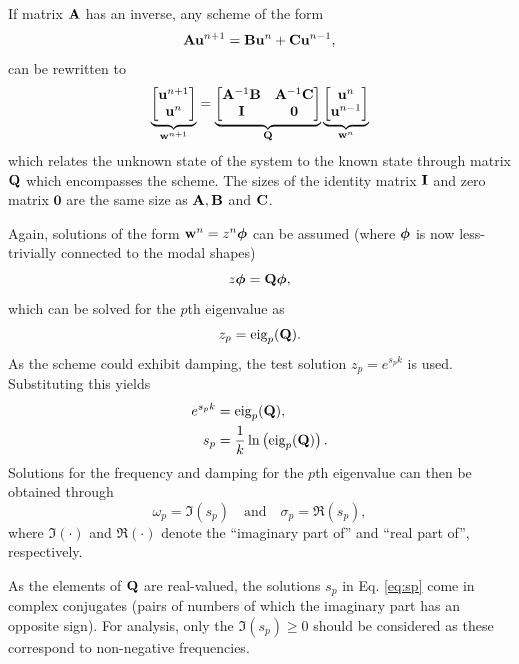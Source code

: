 {{{{If matrix $\mathbf{A}$ has an inverse, any scheme of the form
\begin{equation}\label{eq:modalForm}
    \mathbf{A}\mathbf{u}^{n+1}=\mathbf{B}\mathbf{u}^n + \mathbf{C}\mathbf{u}^{n-1},
\end{equation}
can be rewritten to
\begin{equation}\label{eq:oneStepForm}
    \underbrace{\begin{bmatrix}
        \mathbf{u}^{n+1}\\
        \mathbf{u}^n
    \end{bmatrix}}_{\mathbf{w}^{n+1}} = 
    \underbrace{\begin{bmatrix}
        \mathbf{A}^{-1}\mathbf{B} & \mathbf{A}^{-1}\mathbf{C}\\
        \mathbf{I} & \mathbf{0}
    \end{bmatrix}}_{\mathbf{Q}}
    \underbrace{\begin{bmatrix}
        \mathbf{u}^n\\
        \mathbf{u}^{n-1}
    \end{bmatrix}}_{\mathbf{w}^n}
\end{equation}
which relates the unknown state of the system to the known state through matrix $\mathbf{Q}$ which encompasses the scheme. The sizes of the identity matrix $\mathbf{I}$ and zero matrix $\mathbf{0}$ are the same size as $\mathbf{A}, \mathbf{B}$ and $\mathbf{C}$.

Again, solutions of the form $\mathbf{w}^n = z^n\boldsymbol{\phi}$ can be assumed (where $\boldsymbol{\phi}$ is now less-trivially connected to the modal shapes)
\begin{equation}
    z\boldsymbol{\phi} = \mathbf{Q}\boldsymbol{\phi} ,
\end{equation}
which can be solved for the $p$th eigenvalue as
\begin{equation}
    z_p = \text{eig}_p(\mathbf{Q}).
\end{equation}
As the scheme could exhibit damping, the test solution $z_p = e^{s_pk}$ is used. Substituting this yields
\begin{align}
    e^{s_pk} &= \text{eig}_p(\mathbf{Q}),\nonumber\\
    s_p &= \frac{1}{k}\ln \left(\text{eig}_p(\mathbf{Q})\right).\label{eq:sp}
\end{align}
Solutions for the frequency and damping for the $p$th eigenvalue can then be obtained through
\begin{equation}
    \omega_p = \mathfrak{I}(s_p) \quad \text{and} \quad \sigma_p = \mathfrak{R}(s_p),
\end{equation}
where $\mathfrak{I}(\cdot)$ and $\mathfrak{R}(\cdot)$ denote the ``imaginary part of'' and ``real part of'', respectively. 

As the elements of $\mathbf{Q}$ are real-valued, the solutions $s_p$ in Eq. \eqref{eq:sp} come in complex conjugates (pairs of numbers of which the imaginary part has an opposite sign). For analysis, only the $\mathfrak{I}(s_p)\geq 0$ should be considered as these correspond to non-negative frequencies. 

}}}}
